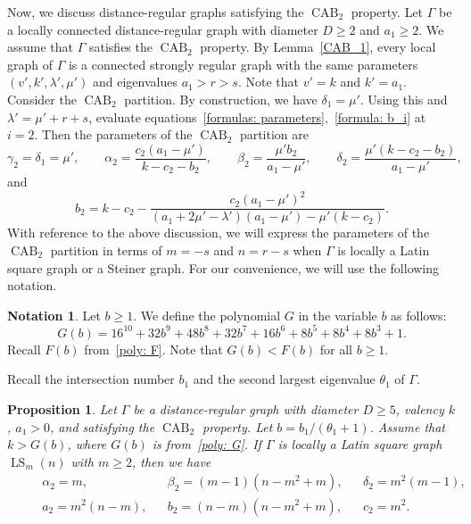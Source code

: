 \documentclass[11pt]{article}
\newtheorem{prop}[theo]{Proposition}
\theoremstyle{definition}
\newtheorem{nota}[theo]{Notation}
\numberwithin{equation}{section}
\numberwithin{equation}{section}
\begin{document}
Now, we discuss distance-regular graphs satisfying the $\operatorname{CAB}_2$ property.
Let $\Gamma$ be a locally connected distance-regular graph with diameter $D \geqslant 2$ and $a_1\geqslant 2$.
We assume that $\Gamma$ satisfies the $\operatorname{CAB}_2$ property. 
By Lemma~\ref{CAB_1}, every local graph of $\Gamma$ is a connected strongly regular graph with the same parameters $(v', k', \lambda', \mu')$ and eigenvalues $a_1 > r > s$.
Note that $v'=k$ and $k'=a_1$.
Consider the $\operatorname{CAB}_2$ partition. 
By construction, we have $\delta_1=\mu'$.
Using this and $\lambda' = \mu' + r + s$, evaluate equations~\eqref{formulas: parameters},~\eqref{formula: b_i} at $i=2$. 
Then the parameters of the $\operatorname{CAB}_2$ partition are 
\begin{equation}\label{constants2}
	\gamma_2 = \delta_{1}=\mu', \qquad
	\alpha_2 = \frac{c_2(a_1 - \mu')}{k-c_2-b_2}, \qquad 
	\beta_2 = \frac{\mu'b_2}{a_1-\mu'}, \qquad 
	\delta_2 = \frac{\mu'(k-c_2-b_2)}{a_1-\mu'},
\end{equation}
and
\begin{equation}\label{b2}
  b_2 = k-c_2 - \frac{c_2(a_1 -\mu')^2}{(a_1 +2\mu' -\lambda')(a_1 -\mu') -\mu'(k-c_2)}.
\end{equation}
With reference to the above discussion, we will express the parameters of the $\operatorname{CAB}_2$ partition in terms of $m=-s$ and $n=r-s$ when $\Gamma$ is locally a Latin square graph or a Steiner graph.
For our convenience, we will use the following notation.
\begin{nota}
Let $b \geqslant 1$. We define the polynomial $G$ in the variable $b$ as follows:
\begin{equation}\label{poly: G}
	G(b) 
	= 16^{10} + 32b^9 + 48b^8 + 32b^7 + 16b^6 + 8b^5 + 8b^4 + 8b^3 + 1.
\end{equation}
Recall $F(b)$ from~\eqref{poly: F}.
Note that $G(b) < F(b)$ for all $b \geqslant 1$.
\end{nota}

Recall the intersection number $b_1$ and the second largest eigenvalue $\theta_1$ of $\Gamma$.

\begin{prop}\label{LS}
Let $\Gamma$ be a distance-regular graph with diameter $D \geqslant 5$, valency $k$, $a_1 > 0$, and satisfying the $\operatorname{CAB}_2$ property. 
Let $b=b_1/(\theta_1+1)$.
Assume that $k > G(b)$, where $G(b)$ is from~\eqref{poly: G}.
If $\Gamma$ is locally a Latin square graph $\operatorname{LS}_m(n)$ with $m \geqslant 2$,
then we have
\begin{align}
	&& & \alpha_2 =m, && \beta_2 =(m-1)(n-m^2+m), && \delta_2 = m^2(m-1), && \label{lem:LS eq(1)}\\
	&& & a_2 = m^2(n-m), && b_2 = (n-m)(n-m^2+m), && c_2 = m^2. && \label{lem:LS eq(2)}
\end{align}
\end{prop}
\end{document}
